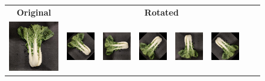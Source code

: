 \bgroup
\def\arraystretch{1.5}
\begin{figure}[tp]
	\begin{center}
		\begin{tabular}{c|ccccccc}
			\textbf{Original} & \multicolumn{7}{c}{\textbf{Rotated}} \\
			\includegraphics[scale=0.4]{./img/bokchoi_0.png} &
			\includegraphics[scale=0.4]{./img/bokchoi_1.png} &
			\includegraphics[scale=0.4]{./img/bokchoi_2.png} &
			\includegraphics[scale=0.4]{./img/bokchoi_3.png} &
			\includegraphics[scale=0.4]{./img/bokchoi_4.png} &
			\includegraphics[scale=0.4]{./img/bokchoi_5.png} &

\end{tabular}
\end{center}
\end{figure}
